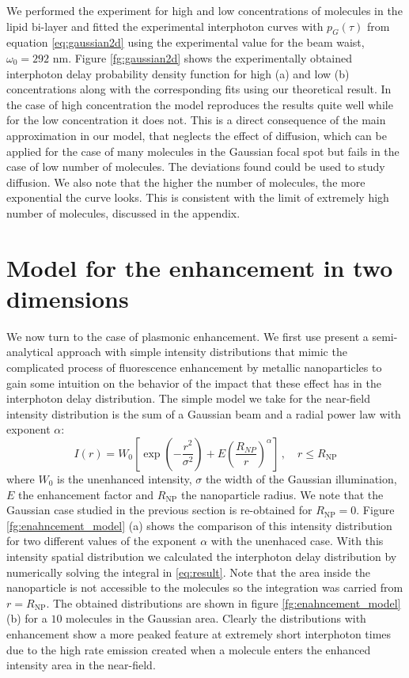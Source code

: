 We performed the experiment for high and low concentrations of molecules in the lipid bi-layer and fitted 
the experimental interphoton curves with $p_{G}(\tau)$ from equation \ref{eq:gaussian2d} using the 
experimental value for the beam waist, $\omega_0=292$ nm. 
Figure \ref{fg:gaussian2d} shows the experimentally obtained interphoton delay probability density function for high (a) and low (b) concentrations along with the corresponding fits using our theoretical result. 
In the case of high concentration the model reproduces the results quite well while for the low concentration it does not. This is a direct consequence of the main approximation in our model, that neglects the effect of diffusion, which can be applied for the case of many molecules in the Gaussian focal spot but fails in the case of low number of molecules. The deviations found could be used to study diffusion. We also note that the higher the number of molecules, the more exponential
the curve looks. This is consistent with the limit of extremely high number of molecules, discussed in the appendix. 


\section{Model for the enhancement in two dimensions}

We now turn to the case of plasmonic enhancement. We first use present a semi-analytical approach with simple 
intensity distributions that mimic the complicated process of fluorescence enhancement by metallic nanoparticles to 
gain some intuition on the behavior of the impact that these effect has in the interphoton delay distribution.
The simple model we take for the near-field intensity distribution is the sum of a Gaussian beam
and a radial power law with exponent $\alpha$: 
\begin{equation}
I(r) = W_0 \left[ \exp \left(-\frac{r^2}{\sigma^2} \right) + E \left(\frac{R_{NP}}{r}\right)^\alpha  \right]\,, 
\quad r \leq R_\textrm{NP}
\label{eq:enhancement_model}
\end{equation}
where $W_0$ is the unenhanced intensity, $\sigma$ the width of the Gaussian illumination, $E$ the enhancement
factor and $R_\textrm{NP}$ the nanoparticle radius. 
We note that the Gaussian case studied in the previous section is re-obtained for $R_\textrm{NP}=0$. Figure
\ref{fg:enahncement_model} (a) shows the comparison of this intensity distribution for two different values 
of the exponent $\alpha$ with the unenhaced case. 
With this intensity spatial distribution we calculated the interphoton delay distribution by numerically 
solving the integral in \ref{eq:result}. Note that the area inside the nanoparticle is not accessible
to the molecules so the integration was carried from $r=R_\textrm{NP}$.
The obtained distributions are shown in figure \ref{fg:enahncement_model} (b) 
for a $10$ molecules in the Gaussian area.  Clearly the distributions with enhancement show a more peaked feature at
extremely short interphoton times due to the high rate emission created when a molecule enters the 
enhanced intensity area in the near-field. 

